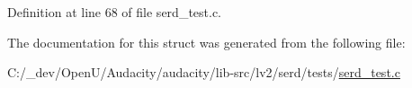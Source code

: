 Definition at line 68 of file serd\+\_\+test.\+c.



The documentation for this struct was generated from the following file\+:\begin{DoxyCompactItemize}
\item 
C\+:/\+\_\+dev/\+Open\+U/\+Audacity/audacity/lib-\/src/lv2/serd/tests/\hyperlink{serd__test_8c}{serd\+\_\+test.\+c}\end{DoxyCompactItemize}
